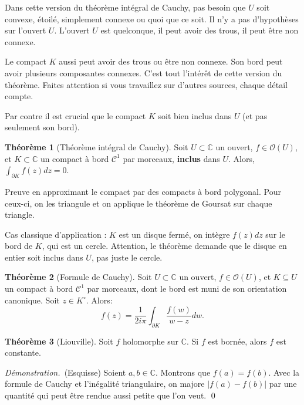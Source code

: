 \documentclass[11pt,a4paper]{article}
\newcommand{\C}{\mathbb{C}}
\theoremstyle{definition}
\newtheorem{theoreme}{Th\'eor\`eme}[section]
\renewenvironment{proof}{\color{preuve}\emph{Démonstration.~}}{\qed\vspace{1em}}
\theoremstyle{plain}
\begin{document}
\begin{remarque}
Dans cette version du théorème intégral de Cauchy, pas besoin que $U$ soit convexe, étoilé, simplement connexe ou quoi que ce soit. Il n'y a pas d'hypothèses sur l'ouvert $U$. L'ouvert $U$ est quelconque, il peut avoir des \og trous\fg{}, il peut être non connexe.

Le compact $K$ aussi peut avoir des trous ou être non connexe. Son bord peut avoir plusieurs composantes connexes. C'est tout l'intérêt de cette version du théorème. Faites attention si vous travaillez sur d'autres sources, chaque détail compte.

Par contre il est crucial que le compact $K$ soit bien inclus dans $U$ (et pas seulement son bord).
\end{remarque}
\begin{theoreme}[Théorème intégral de Cauchy]
Soit $U\subset \C$ un ouvert, $f\in \mathcal O(U)$, et $K\subset \C$ un compact à bord $\mathcal C^1$ par morceaux, \textbf{inclus} dans $U$.
Alors, $\int_{\partial K} f(z)dz = 0$.
\end{theoreme}

Preuve en approximant le compact par des compacts à bord polygonal. Pour ceux-ci, on les triangule et on applique le théorème de Goursat sur chaque triangle.


Cas classique d'application : $K$ est un disque fermé, on intègre $f(z)dz$ sur le bord de $K$, qui est un cercle. Attention, le théorème demande que le disque en entier soit inclus dans $U$, pas juste le cercle.




\begin{theoreme}[Formule de Cauchy]
Soit $U\subset \C$ un ouvert, $f\in \mathcal O(U)$, et $K\subseteq U$ un compact à bord $\mathcal C^1$ par morceaux, dont le bord est muni de son orientation canonique.
Soit $z\in K^{\circ}$.
Alors:
\[ f(z) = \frac{1}{2i\pi}\int_{\partial K} \frac{f(w)}{w-z}dw.\]
\end{theoreme}


\begin{theoreme}[Liouville]
Soit $f$ holomorphe sur $\C$.
Si $f$ est bornée, alors $f$ est constante.
\end{theoreme}

\begin{proof}(Esquisse)
Soient $a, b \in \C$. Montrons  que $f(a)=f(b)$.
Avec la formule de Cauchy et l'inégalité triangulaire, on majore $|f(a)-f(b)|$ par une quantité qui peut être rendue aussi petite que l'on veut.
\end{proof}
\end{document}
